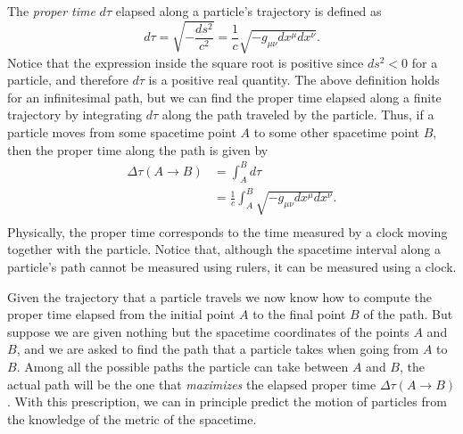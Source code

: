 \documentclass[11pt, a4paper,oneside,openright]{book}
\numberwithin{equation}{section}
\begin{document}
The {\it proper time} $d\tau$ elapsed along a particle's trajectory is defined as
\begin{equation} \label{eq:proper_time_dtau}
d\tau=\sqrt{-\frac{ds^2}{c^2}}=\frac{1}{c}\sqrt{-g_{\mu\nu}dx^{\mu}dx^{\nu}}.
\end{equation}
Notice that the expression inside the square root is positive since $ds^2<0$ for a particle, and therefore $d\tau$ is a positive real quantity. The above definition holds for an infinitesimal path, but we can find the proper time elapsed along a finite trajectory by integrating $d\tau$ along the path traveled by the particle. Thus, if a particle moves from some spacetime point $A$ to some other spacetime point $B$, then the proper time along the path is given by
\begin{equation}
\begin{split}
\Delta\tau(A\to B)&=\int_A^B d\tau\\
&=\frac{1}{c}\int_A^B \sqrt{-g_{\mu\nu}dx^{\mu}dx^{\nu}}.\\
\end{split}
\end{equation}
Physically, the proper time corresponds to the time measured by a clock moving together with the particle. Notice that, although the spacetime interval along a particle's path cannot be measured using rulers, it can be measured using a clock.

Given the trajectory that a particle travels we now know how to compute the proper time elapsed from the initial point $A$ to the final point $B$ of the path. But suppose we are given nothing but the spacetime coordinates of the points $A$ and $B$, and we are asked to find the path that a particle takes when going from $A$ to $B$. Among all the possible paths the particle can take between $A$ and $B$, the actual path will be the one that {\it maximizes} the elapsed proper time $\Delta\tau(A\to B)$. With this prescription, we can in principle predict the motion of particles from the knowledge of the metric of the spacetime.
\end{document}
